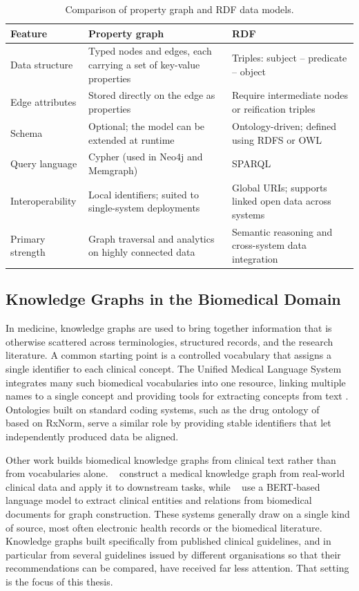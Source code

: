 \begin{table}[htbp]
\centering
\small\setlength{\tabcolsep}{5pt}
\begin{tabular}{p{2.6cm} p{5.2cm} p{5.2cm}}
\hline
\textbf{Feature} & \textbf{Property graph} & \textbf{RDF} \\
\hline
Data structure
  & Typed nodes and edges, each carrying a set of key-value properties
  & Triples: subject -- predicate -- object \\[4pt]
Edge attributes
  & Stored directly on the edge as properties
  & Require intermediate nodes or reification triples \\[4pt]
Schema
  & Optional; the model can be extended at runtime
  & Ontology-driven; defined using RDFS or OWL \\[4pt]
Query language
  & Cypher (used in Neo4j and Memgraph)
  & SPARQL \\[4pt]
Interoperability
  & Local identifiers; suited to single-system deployments
  & Global URIs; supports linked open data across systems \\[4pt]
Primary strength
  & Graph traversal and analytics on highly connected data
  & Semantic reasoning and cross-system data integration \\
\hline
\end{tabular}
\caption{Comparison of property graph and RDF data models.}
\label{tab:lpg-rdf}
\end{table}

\subsection{Knowledge Graphs in the Biomedical Domain}
\label{sec:bg-kg-biomed}

In medicine, knowledge graphs are used to bring together information that is
otherwise scattered across terminologies, structured records, and the research
literature. A common starting point is a controlled vocabulary that assigns a
single identifier to each clinical concept. The Unified Medical Language System integrates many such biomedical
vocabularies into one resource, linking multiple names to a single concept and
providing tools for extracting concepts from text \cite{bodenreider2004}. Ontologies built on standard coding systems, such
as the drug ontology of ~\cite{hanna2013} based on RxNorm, serve a
similar role by providing stable identifiers that let independently produced
data be aligned.

Other work builds biomedical knowledge graphs from clinical text rather than
from vocabularies alone. ~\cite{li2020} construct a medical knowledge
graph from real-world clinical data and apply it to downstream tasks, while
~\cite{harnoune2021} use a BERT-based language model to extract
clinical entities and relations from biomedical documents for graph
construction. These systems generally draw on a single kind of source, most
often electronic health records or the biomedical literature. Knowledge graphs
built specifically from published clinical guidelines, and in particular from
several guidelines issued by different organisations so that their
recommendations can be compared, have received far less attention. That
setting is the focus of this thesis.

